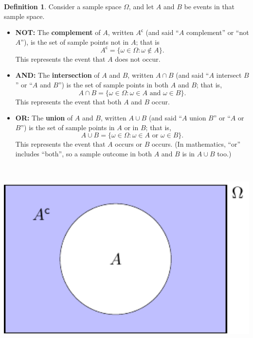 \documentclass[
  a4paper,
]{book}
\providecommand{\tightlist}{%
  \setlength{\itemsep}{0pt}\setlength{\parskip}{0pt}}
\theoremstyle{definition}
\newtheorem{definition}{Definition}[chapter]
\theoremstyle{definition}
\theoremstyle{definition}
\theoremstyle{definition}
\theoremstyle{remark}
\begin{document}
\begin{definition}

Consider a sample space \(\Omega\), and let \(A\) and \(B\) be events in that sample space.

\begin{itemize}
\tightlist
\item
  \textbf{{NOT:}} The \textbf{complement} of \(A\), written \(A^\mathsf{c}\) (and said ``\(A\) complement'' or ``not \(A\)''), is the set of sample points not in \(A\); that is
  \[ A^\mathsf{c}= \{\omega \in \Omega : \omega \not\in A \} . \]
  This represents the event that \(A\) does not occur.
\item
  \textbf{{AND}:} The \textbf{intersection} of \(A\) and \(B\), written \(A \cap B\) (and said ``\(A\) intersect \(B\)'' or ``\(A\) and \(B\)'') is the set of sample points in both \(A\) and \(B\); that is,\\
  \[ A \cap B = \{\omega \in \Omega : \omega \in A \text{ and } \omega \in B \} . \]
  This represents the event that both \(A\) and \(B\) occur.
\item
  \textbf{{OR:}} The \textbf{union} of \(A\) and \(B\), written \(A \cup B\) (and said ``\(A\) union \(B\)'' or ``\(A\) or \(B\)'') is the set of sample points in \(A\) or in \(B\); that is,
  \[ A \cup B = \{\omega \in \Omega : \omega \in A \text{ or } \omega \in B \} . \]
  This represents the event that \(A\) occurs or \(B\) occurs. (In mathematics, ``or'' includes ``both'', so a sample outcome in both \(A\) and \(B\) is in \(A\cup B\) too.)
\end{itemize}

~

\begin{center}\includegraphics[width=550pt]{math1710_files/figure-latex/venn-not-1} \end{center}


\end{definition}
\end{document}

